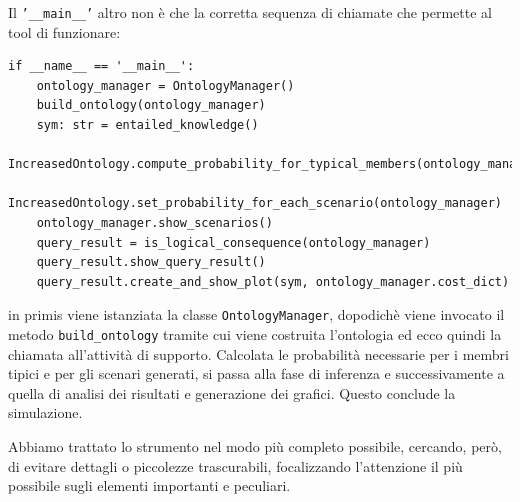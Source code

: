 Il \texttt{'__main__'} altro non è che la corretta sequenza di chiamate che 
permette al tool di funzionare: 
\begin{verbatim}
if __name__ == '__main__':
	ontology_manager = OntologyManager()
	build_ontology(ontology_manager)
	sym: str = entailed_knowledge()
	IncreasedOntology.compute_probability_for_typical_members(ontology_manager)
	IncreasedOntology.set_probability_for_each_scenario(ontology_manager)
	ontology_manager.show_scenarios()
	query_result = is_logical_consequence(ontology_manager)
	query_result.show_query_result()
	query_result.create_and_show_plot(sym, ontology_manager.cost_dict)
\end{verbatim}
in primis viene istanziata la classe \texttt{OntologyManager}, 
dopodichè viene invocato il metodo \texttt{build_ontology} tramite cui viene costruita l'ontologia ed ecco quindi la chiamata all'attività di supporto.
Calcolata le probabilità necessarie per i membri tipici e per gli scenari generati, si passa
alla fase di inferenza e successivamente a quella di analisi dei risultati e generazione dei
grafici. Questo conclude la simulazione.

Abbiamo trattato lo strumento nel modo più completo possibile, cercando, però, di evitare
dettagli o piccolezze trascurabili, focalizzando l'attenzione il più possibile sugli
elementi importanti e peculiari.

                                                            

